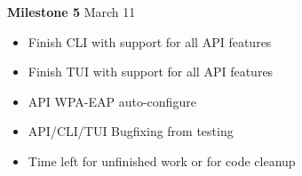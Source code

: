 \documentclass[11pt]{article}
\begin{document}
\textbf{Milestone 5} March 11
\begin{itemize}
  \item Finish CLI with support for all API features
  \item Finish TUI with support for all API features
  \item API WPA-EAP auto-configure
  \item API/CLI/TUI Bugfixing from testing
  \item Time left for unfinished work or for code cleanup
\end{itemize}
\end{document}
